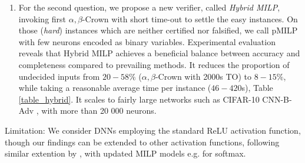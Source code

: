 \begin{enumerate}
	\item For the second question, we propose a new verifier, called {\em Hybrid MILP}, invoking first 	$\alpha,\beta$-Crown with short time-out to settle the easy instances. On those ({\em hard}) instances which are neither certified nor falsified, we call pMILP with few neurons encoded as binary variables. Experimental evaluation reveals that Hybrid MILP achieves a beneficial balance between accuracy and completeness compared to prevailing methods. It reduces the proportion of undecided inputs from $20-58\%$ ($\alpha,\beta$-Crown with 2000s TO) to $8-15\%$, while taking a reasonable average time per instance ($46-420$s), Table \ref{table_hybrid}. It scales to fairly large networks such as CIFAR-10 CNN-B-Adv \cite{SDPFI}, with more than 20 000 neurons.
\end{enumerate}

Limitation: We consider DNNs employing the standard ReLU activation function, though our findings can be extended to other activation functions, following similar extention by \cite{DivideAndSlide}, with updated MILP models e.g. for {\color{red} softmax}. 




